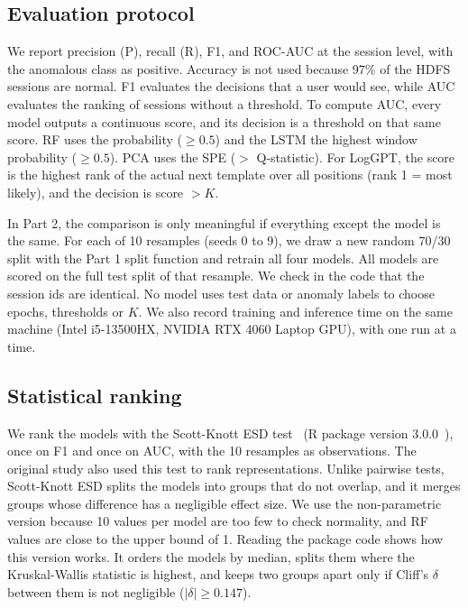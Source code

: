 \documentclass[10pt, conference]{IEEEtran}
\begin{document}
\subsection{Evaluation protocol}

We report precision (P), recall (R), F1, and ROC-AUC at the session level, with the anomalous class as positive. Accuracy is not used because 97\% of the HDFS sessions are normal. F1 evaluates the decisions that a user would see, while AUC evaluates the ranking of sessions without a threshold. To compute AUC, every model outputs a continuous score, and its decision is a threshold on that same score. RF uses the probability ($\geq 0.5$) and the LSTM the highest window probability ($\geq 0.5$). PCA uses the SPE ($>$ Q-statistic). For LogGPT, the score is the highest rank of the actual next template over all positions (rank 1 = most likely), and the decision is score $> K$.

In Part 2, the comparison is only meaningful if everything except the model is the same. For each of 10 resamples (seeds 0 to 9), we draw a new random 70/30 split with the Part 1 split function and retrain all four models. All models are scored on the full test split of that resample. We check in the code that the session ids are identical. No model uses test data or anomaly labels to choose epochs, thresholds or $K$. We also record training and inference time on the same machine (Intel i5-13500HX, NVIDIA RTX 4060 Laptop GPU), with one run at a time.

\subsection{Statistical ranking}

We rank the models with the Scott-Knott ESD test~\cite{tantithamthavorn2017empirical} (R package version 3.0.0~\cite{scottknottesd}), once on F1 and once on AUC, with the 10 resamples as observations. The original study also used this test to rank representations. Unlike pairwise tests, Scott-Knott ESD splits the models into groups that do not overlap, and it merges groups whose difference has a negligible effect size. We use the non-parametric version because 10 values per model are too few to check normality, and RF values are close to the upper bound of 1. Reading the package code shows how this version works. It orders the models by median, splits them where the Kruskal-Wallis statistic is highest, and keeps two groups apart only if Cliff's $\delta$~\cite{cliff1993dominance} between them is not negligible ($|\delta| \geq 0.147$).
\end{document}

